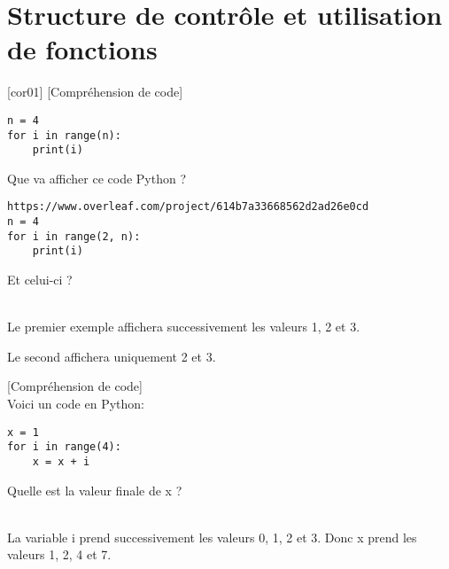 \documentclass[a4paper,12pt]{article}
\newcommand{\numero}{11}                                    %
\begin{document}

\setcounter{section}{\numero}

\section{Structure de contrôle et utilisation de fonctions}
[cor01]
\exo{}[Compréhension de code]  ~\\ 
\begin{lstlisting}
n = 4
for i in range(n):
    print(i)
\end{lstlisting}
Que va afficher ce code Python ?
\begin{lstlisting}https://www.overleaf.com/project/614b7a33668562d2ad26e0cd
n = 4
for i in range(2, n):
    print(i)
\end{lstlisting}
Et celui-ci ?
\begin{correction}
		~\\ \vspace{-5pt}
		Le premier exemple affichera successivement les valeurs 1, 2 et 3.
		
		Le second affichera uniquement 2 et 3.
	\end{correction}
\finexo
\exo{}[Compréhension de code]  ~\\ 
Voici un code en Python:
\begin{lstlisting}
x = 1
for i in range(4):
    x = x + i
\end{lstlisting}
Quelle est la valeur finale de x ?
\begin{correction}
		~\\ \vspace{-5pt}
		La variable i prend successivement les valeurs 0, 1, 2 et 3. Donc x prend les valeurs 1, 2, 4 et 7.
\end{correction}
\finexo
\end{document}
